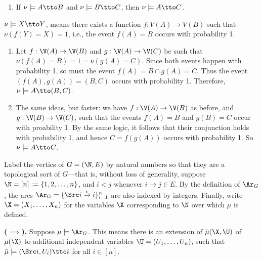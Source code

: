 \begin{subappendices}
\begin{lemma}
\begin{enumerate}
        \item 
        If $\nu \models A \tto B$ and $\nu \models B \tto C$, then $\nu \models A \tto C$. 
    \end{enumerate}
\end{lemma}
\begin{lproof}
$\nu \models X \tto Y$, means there exists a function $f : V(A) \to V(B)$ such that $\nu( f(Y) = X ) = 1$, i.e., the event $f(A) = B$  occurs with probability 1.
\begin{enumerate}
    \item Let $f : \V(A) \to \V(B)$ and $g : \V(A) \to \V(C)$ be such that $\nu(f(A) = B) = 1 = \nu(g(A) = C)$. Since both events happen with probability 1, so must the event $f(A) = B \cap g(A) = C$. Thus the event $(f(A), g(A)) = (B,C)$ occurs with probability 1.  Therefore, $\nu \models A \tto (B,C)$. 
    \item The same ideas, but faster: we have $f : \V(A) \to \V(B)$ as before, and $g : \V(B) \to \V(C)$, such that the events $f(A) = B$ and $g(B) = C$ occur with proability 1. By the same logic, it follows that their conjunction holds with probability 1, and hence $C = f(g(A))$ occurs with probability 1. So $\nu \models A \tto C$. 
\end{enumerate}
\end{lproof}

\begin{lproof}
    \label{proof:bns}
    Label the vertics of $G = (\N, E)$ by natural numbers so that they are a topological sort of $G$---that is, without loss of generality, suppose $\N = [n] := \{1, 2, \ldots, n\}$, and $i < j$ whenever  $i \to j \in E$. 
    By the definition of $\Ar_G$, 
    the arcs $\Ar_G = \{ \Src i \xrightarrow{i} i \}_{i=1}^n$ are also indexed by integers.
    Finally, write $\X = (X_1, \ldots, X_n)$ for the variables $\X$ corresponding to $\N$ over which $\mu$ is defined. 
    
    \textbf{($\implies$).}
    Suppose $\mu \models \Ar_G$. 
    This means there
    is an extension of $\bar\mu(\X, \U)$ of $\mu(\X)$ to additional
        independent variables $\U = (U_1, \ldots, U_n)$, such that $\bar\mu \models (\Src i, U_i) \tto i$ for all $i \in [n]$. 
    

\end{lproof}
\end{subappendices}
